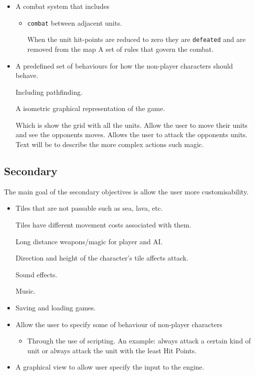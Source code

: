 \begin{itemize}
\begin{itemize}
	\item A combat system that includes
		\begin{itemize}
			\item \texttt{combat} between adjacent units.
			\begin{itemize}
				\cross When the unit hit-points are reduced to zero they are \texttt{defeated} and are removed from the map
			\tick A set of rules that govern the combat.
			\end{itemize}
			
		\end{itemize}
	
	\item A predefined set of behaviours for how the non-player characters should behave.
	\begin{itemize}
		\tick Including pathfinding.
	\end{itemize}
	
	\tick A isometric graphical representation of the game.
	\begin{itemize}
		\tick Which is show the grid with all the units.
		\tick Allow the user to move their units and see the opponents moves.
		\tick Allows the user to attack the opponents units.
		\tick Text will be to describe the more complex actions such magic.
	\end{itemize}
\end{itemize}
\end{itemize}

\subsection{Secondary}
\label{secondary}
The main goal of the secondary objectives is allow the user more customisability. 
\begin{itemize}
	\tick Tile have \texttt{height}, where units can only move to tiles of a smilier height.
	\item Tiles that are not passable such as sea, lava, etc.
	
	\tick Tiles have different movement costs associated with them.
		
	\cross Long distance weapons\slash magic for player and AI.
	
	\cross Direction and height of the character's tile affects attack.
	
	\tick Sound effects.
	
	\tick Music.
	
	\item Saving and loading games.
	
	\item Allow the user to specify some of behaviour of non-player characters
	\begin{itemize}
		\item Through the use of scripting.
		\cross An example: always attack a certain kind of unit or always attack the unit with the least Hit Points.
	\end{itemize}
	
	\item A graphical view to allow user specify the input to the engine.
\end{itemize}

